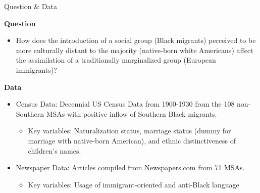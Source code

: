 \documentclass[11pt, aspectratio=169]{beamer}
\begin{document}

\begin{frame}{Question \& Data}

\centering
\textbf{Question}

\vspace{-0.4cm}
\hrulefill\hspace{0.5em}\dotfill\hspace{0.5em}\hrulefill

\begin{itemize}
    \item How does the introduction of a social group (Black migrants) 
    perceived to be more culturally distant to the majority (native-born 
    white Americans) affect the assimilation of a traditionally marginalized 
    group (European immigrants)?
\end{itemize}

\textbf{Data}

\vspace{-0.4cm}
\hrulefill\hspace{0.5em}\dotfill\hspace{0.5em}\hrulefill

\begin{itemize}
    \item Census Data: Decennial US Census Data from 1900-1930 from 
        the 108 non-Southern MSAs with 
        positive inflow of Southern Black migrants.
        \begin{itemize}
            \item Key variables: Naturalization status, 
                marriage status (dummy for marriage with native-born American), 
                and ethnic distinctiveness of children's names.
        \end{itemize}
    \item Newspaper Data: Articles compiled from Newspapers.com from 71 MSAs.
        \begin{itemize}
            \item Key variables: Usage of immigrant-oriented and anti-Black 
                language
        \end{itemize}
\end{itemize}

\end{frame}

\end{document}
